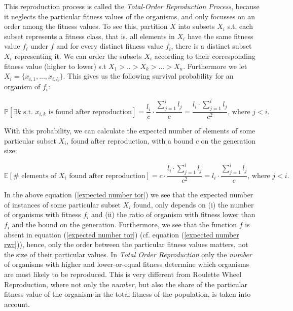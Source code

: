 \documentclass[a4paper]{article}
\newcommand{\Prob}[1]{\mathbb{P}[#1]}
\newcommand{\Expec}[1]{\mathbb{E}[#1]}
\theoremstyle{dotless}
\begin{document}
This reproduction process is called the \textit{Total-Order Reproduction Process}, because it neglects the particular fitness values of the organisms, and only focusses on an order among the fitness values. To see this, partition $X$ into subsets $X_i$ s.t. each subset represents a fitness class, that is, all elements in $X_i$ have the same fitness value $f_i$ under $f$ and for every distinct fitness value $f_i$, there is a distinct subset $X_i$ representing it. We can order the subsets $X_i$ according to their corresponding fitness value (higher to lower) s.t $X_1 > .. > X_k > ... > X_n$. Furthermore we let $X_i = \{ x_{i,1},...,x_{i,l_i} \}$. This gives us the following survival probability for an organism of $f_i$:

\begin{equation}
\Prob{\exists k \text{ s.t. } x_{i,k} \text{ is found after reproduction}} = \frac{l_i}{c} \cdot \dfrac{\sum^i_{j=1} l_j}{c} = \frac{l_i \cdot \sum^i_{j=1} l_j}{c^2} \text{, where $j<i$.}
\end{equation}

With this probability, we can calculate the expected number of elements of some particular subset $X_i$, found after reproduction, with a bound $c$ on the generation size:

\begin{equation}\label{expected number tor}
\Expec{ \# \text{ elements of } X_i \text{ found after reproduction}} = c \cdot \frac{l_i \cdot \sum^i_{j=1} l_j}{c^2} = l_i \cdot \frac{\sum^i_{j=1} l_j}{c} \text{, where $j<i$.}
\end{equation}

In the above equation (\ref{expected number tor}) we see that the expected number of instances of some particular subset $X_i$ found, only depends on (i) the number of organisms with fitness $f_i$ and (ii) the ratio of organism with fitness lower than $f_i$ and the bound on the generation. Furthermore, we see that the function $f$ is absent in equation (\ref{expected number tor}) (cf. equation (\ref{expected number rwr})), hence, only the order between the particular fitness values matters, not the size of their particular values. In \emph{Total Order Reproduction} only the \textit{number} of organisms with higher and lower-or-equal fitness determine which organisms are most likely to be reproduced. This is very different from Roulette Wheel Reproduction, where not only the \textit{number}, but also the share of the particular fitness value of the organism in the total fitness of the population, is taken into account.\\ 
\end{document}
